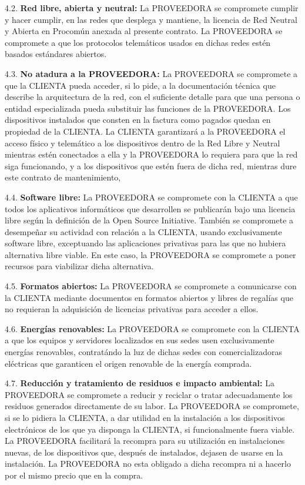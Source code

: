\documentclass[11pt,spanish,a4paper,]{article}
\begin{document}
4.2. \textbf{Red libre, abierta y neutral:} La PROVEEDORA se compromete
cumplir y hacer cumplir, en las redes que desplega y mantiene, la
licencia de Red Neutral y Abierta en Procomún anexada al presente
contrato. La PROVEEDORA se compromete a que los protocolos telemáticos
usados en dichas redes estén basados estándares abiertos.

4.3. \textbf{No atadura a la PROVEEDORA:} La PROVEEDORA se compromete a
que la CLIENTA pueda acceder, si lo pide, a la documentación técnica que
describe la arquitectura de la red, con el suficiente detalle para que
una persona o entidad especializada pueda substituir las funciones de la
PROVEEDORA. Los dispositivos instalados que consten en la factura como
pagados quedan en propiedad de la CLIENTA. La CLIENTA garantizará a la
PROVEEDORA el acceso físico y telemático a los dispositivos dentro de la
Red Libre y Neutral mientras estén conectados a ella y la PROVEEDORA lo
requiera para que la red siga funcionando, y a los dispositivos que
estén fuera de dicha red, mientras dure este contrato de mantenimiento,

4.4. \textbf{Software libre:} La PROVEEDORA se compromete con la CLIENTA
a que todos los aplicativos informáticos que desarrollen se publicarán
bajo una licencia libre según la definición de la Open Source
Initiative. También se compromete a desempeñar su actividad con relación
a la CLIENTA, usando exclusivamente software libre, exceptuando las
aplicaciones privativas para las que no hubiera alternativa libre
viable. En este caso, la PROVEEDORA se compromete a poner recursos para
viabilizar dicha alternativa.

4.5. \textbf{Formatos abiertos:} La PROVEEDORA se compromete a
comunicarse con la CLIENTA mediante documentos en formatos abiertos y
libres de regalías que no requieran la adquisición de licencias
privativas para acceder a ellos.

4.6. \textbf{Energías renovables:} La PROVEEDORA se compromete con la
CLIENTA a que los equipos y servidores localizados en sus sedes usen
exclusivamente energías renovables, contratándo la luz de dichas sedes
con comercializadoras eléctricas que garanticen el origen renovable de
la energía comprada.

4.7. \textbf{Reducción y tratamiento de residuos e impacto ambiental:}
La PROVEEDORA se compromete a reducir y reciclar o tratar adecuadamente
los residuos generados directamente de su labor. La PROVEEDORA se
compromete, si se lo pidiera la CLIENTA, a dar utilidad en la
instalación a los dispositivos electrónicos de los que ya disponga la
CLIENTA, si funcionalmente fuera viable. La PROVEEDORA facilitará la
recompra para su utilización en instalaciones nuevas, de los
dispositivos que, después de instalados, dejasen de usarse en la
instalación. La PROVEEDORA no esta obligado a dicha recompra ni a
hacerlo por el mismo precio que en la compra.
\end{document}
